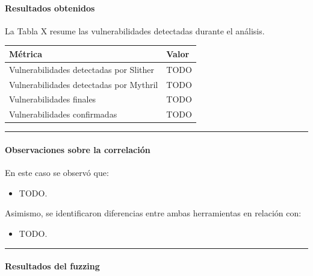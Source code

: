 \paragraph{Resultados obtenidos}\label{resultados-obtenidos}

La Tabla X resume las vulnerabilidades detectadas durante el análisis.

{\def\LTcaptype{none} %
\begin{longtable}[]{@{}ll@{}}
\toprule\noalign{}
Métrica & Valor \\
\midrule\noalign{}
\endhead
\bottomrule\noalign{}
\endlastfoot
Vulnerabilidades detectadas por Slither & TODO \\
Vulnerabilidades detectadas por Mythril & TODO \\
Vulnerabilidades finales & TODO \\
Vulnerabilidades confirmadas & TODO \\
\end{longtable}
}

\begin{center}\rule{0.5\linewidth}{0.5pt}\end{center}

\paragraph{Observaciones sobre la
correlación}\label{observaciones-sobre-la-correlaciuxf3n}

En este caso se observó que:

\begin{itemize}
\tightlist
\item
  TODO.
\end{itemize}

Asimismo, se identificaron diferencias entre ambas herramientas en
relación con:

\begin{itemize}
\tightlist
\item
  TODO.
\end{itemize}

\begin{center}\rule{0.5\linewidth}{0.5pt}\end{center}

\paragraph{Resultados del fuzzing}\label{resultados-del-fuzzing-1}


